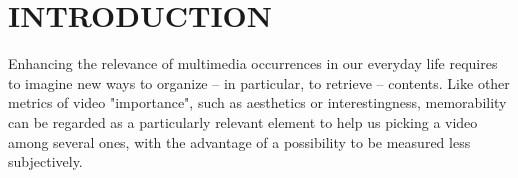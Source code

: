 \documentclass[sigconf]{acmart}
\begin{document}


\maketitle


\section{INTRODUCTION}%
Enhancing the relevance of multimedia occurrences in our everyday life requires to imagine new ways to organize -- in particular, to retrieve -- contents.
Like other metrics of video "importance", such as aesthetics or interestingness, memorability can be regarded as a particularly relevant element to help us picking a video among several ones, with the advantage of a possibility to be measured less subjectively.
\end{document}
